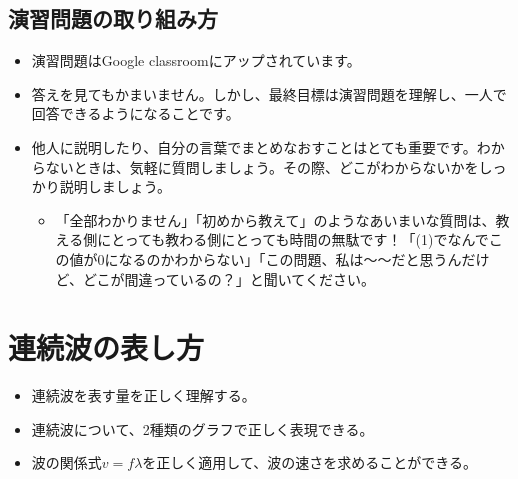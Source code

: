 \documentclass[
  letterpaper,
]{bxjsbook}
\providecommand{\tightlist}{%
  \setlength{\itemsep}{0pt}\setlength{\parskip}{0pt}}\usepackage{longtable,booktabs,array}
\begin{document}
\section{演習問題の取り組み方}\label{ux6f14ux7fd2ux554fux984cux306eux53d6ux308aux7d44ux307fux65b9}

\begin{itemize}
\item
  演習問題はGoogle classroomにアップされています。
\item
  答えを見てもかまいません。しかし、最終目標は演習問題を理解し、一人で回答できるようになることです。
\item
  他人に説明したり、自分の言葉でまとめなおすことはとても重要です。わからないときは、気軽に質問しましょう。その際、どこがわからないかをしっかり説明しましょう。

  \begin{itemize}
  \tightlist
  \item
    「全部わかりません」「初めから教えて」のようなあいまいな質問は、教える側にとっても教わる側にとっても時間の無駄です！「(1)でなんでこの値が0になるのかわからない」「この問題、私は～～だと思うんだけど、どこが間違っているの？」と聞いてください。
  \end{itemize}
\end{itemize}


\chapter{連続波の表し方}\label{ux9023ux7d9aux6ce2ux306eux8868ux3057ux65b9}

\begin{tcolorbox}[enhanced jigsaw, breakable, rightrule=.15mm, opacitybacktitle=0.6, title=\textcolor{quarto-callout-tip-color}{\faLightbulb}\hspace{0.5em}{このセクションの目標}, coltitle=black, toprule=.15mm, bottomtitle=1mm, bottomrule=.15mm, toptitle=1mm, titlerule=0mm, arc=.35mm, opacityback=0, left=2mm, colback=white, colbacktitle=quarto-callout-tip-color!10!white, leftrule=.75mm, colframe=quarto-callout-tip-color-frame]

\begin{itemize}
\tightlist
\item
  連続波を表す量を正しく理解する。
\item
  連続波について、2種類のグラフで正しく表現できる。
\item
  波の関係式\(v=f \lambda\)を正しく適用して、波の速さを求めることができる。
\end{itemize}

\end{tcolorbox}
\end{document}
